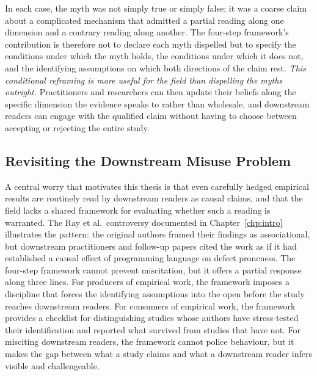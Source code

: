 In each case, the myth was not simply true or simply false; it was a coarse claim about a complicated mechanism that admitted a partial reading along one dimension and a contrary reading along another.
The four-step framework's contribution is therefore not to declare each myth dispelled but to specify the conditions under which the myth holds, the conditions under which it does not, and the identifying assumptions on which both directions of the claim rest.
\emph{This conditional reframing is more useful for the field than dispelling the myths outright.}
Practitioners and researchers can then update their beliefs along the specific dimension the evidence speaks to rather than wholesale, and downstream readers can engage with the qualified claim without having to choose between accepting or rejecting the entire study.

\subsection{Revisiting the Downstream Misuse Problem}

A central worry that motivates this thesis is that even carefully hedged empirical results are routinely read by downstream readers as causal claims, and that the field lacks a shared framework for evaluating whether such a reading is warranted.
The Ray et al.\ controversy documented in Chapter~\ref{chp:intro} illustrates the pattern: the original authors framed their findings as associational, but downstream practitioners and follow-up papers cited the work as if it had established a causal effect of programming language on defect proneness.
The four-step framework cannot prevent miscitation, but it offers a partial response along three lines.
For producers of empirical work, the framework imposes a discipline that forces the identifying assumptions into the open before the study reaches downstream readers.
For consumers of empirical work, the framework provides a checklist for distinguishing studies whose authors have stress-tested their identification and reported what survived from studies that have not.
For misciting downstream readers, the framework cannot police behaviour, but it makes the gap between what a study claims and what a downstream reader infers visible and challengeable.

